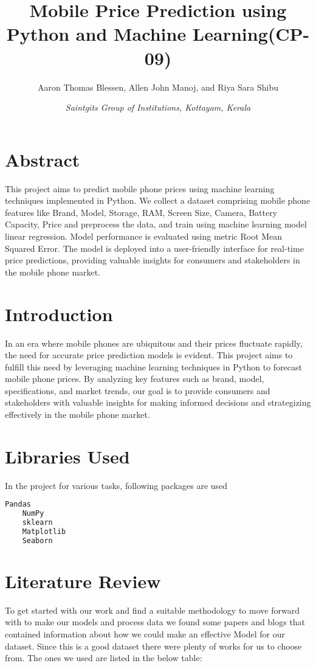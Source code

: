 \documentclass{article}
\title{\textbf{Mobile Price Prediction using Python and Machine Learning(CP-09)}}
\author{Aaron Thomas Blessen, Allen John Manoj, and Riya Sara Shibu}
\date{\textit{Saintgits Group of Institutions, Kottayam, Kerala}}
\begin{document}
\maketitle

\section{Abstract}
This project aims to predict mobile phone prices using machine learning techniques implemented in Python. We collect a dataset comprising mobile phone features like Brand, Model, Storage, RAM, Screen Size, Camera, Battery Capacity, Price and preprocess the data, and train using machine learning model linear regression. Model performance is evaluated using metric Root Mean Squared Error. The model is deployed into a user-friendly interface for real-time price predictions, providing valuable insights for consumers and stakeholders in the mobile phone market.

\section{Introduction}
In an era where mobile phones are ubiquitous and their prices fluctuate rapidly, the need for accurate price prediction models is evident. This project aims to fulfill this need by leveraging machine learning techniques in Python to forecast mobile phone prices. By analyzing key features such as brand, model, specifications, and market trends, our goal is to provide consumers and stakeholders with valuable insights for making informed decisions and strategizing effectively in the mobile phone market.

\section{Libraries Used}
In the project for various tasks, following packages are used
\begin{lstlisting}[language=Python, caption=Libraries used]
    Pandas
    NumPy
    sklearn
    Matplotlib
    Seaborn
\end{lstlisting}

\section{Literature Review}
To get started with our work and find a suitable methodology to move forward with to make our models and process data we found some papers and blogs that contained information about how we could make an effective Model for our dataset.
Since this is a good dataset there were plenty of works for us to choose from. The ones we used are listed in the below table:
\end{document}
